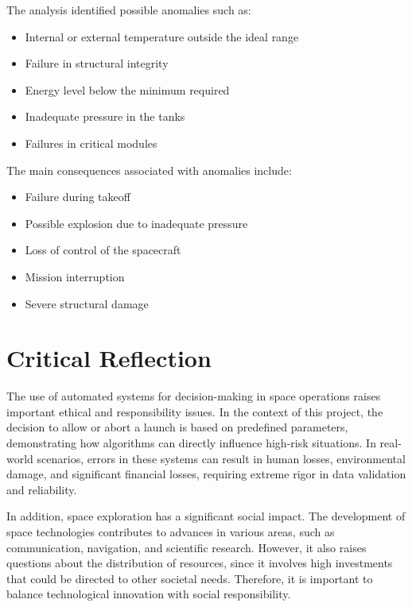 \documentclass[12pt]{article}
\begin{document}
The analysis identified possible anomalies such as:

\begin{itemize}
    \item Internal or external temperature outside the ideal range
    \item Failure in structural integrity
    \item Energy level below the minimum required
    \item Inadequate pressure in the tanks
    \item Failures in critical modules
\end{itemize}

The main consequences associated with anomalies include:

\begin{itemize}
    \item Failure during takeoff
    \item Possible explosion due to inadequate pressure
    \item Loss of control of the spacecraft
    \item Mission interruption
    \item Severe structural damage
\end{itemize}

\section{Critical Reflection}

The use of automated systems for decision-making in space operations raises important ethical and responsibility issues. In the context of this project, the decision to allow or abort a launch is based on predefined parameters, demonstrating how algorithms can directly influence high-risk situations. In real-world scenarios, errors in these systems can result in human losses, environmental damage, and significant financial losses, requiring extreme rigor in data validation and reliability.

In addition, space exploration has a significant social impact. The development of space technologies contributes to advances in various areas, such as communication, navigation, and scientific research. However, it also raises questions about the distribution of resources, since it involves high investments that could be directed to other societal needs. Therefore, it is important to balance technological innovation with social responsibility.
\end{document}
